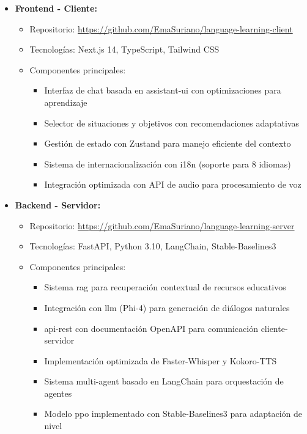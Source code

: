 \begin{itemize}
    \item \textbf{Frontend - Cliente:}
    \begin{itemize}
        \item Repositorio: \url{https://github.com/EmaSuriano/language-learning-client}
        \item Tecnologías: Next.js 14, TypeScript, Tailwind CSS
        \item Componentes principales:
              \begin{itemize}
                  \item Interfaz de chat basada en \gls{assistant-ui} con optimizaciones para aprendizaje
                  \item Selector de situaciones y objetivos con recomendaciones adaptativas
                  \item Gestión de estado con Zustand para manejo eficiente del contexto
                  \item Sistema de internacionalización con i18n (soporte para 8 idiomas)
                  \item Integración optimizada con API de audio para procesamiento de voz
              \end{itemize}
    \end{itemize}

    \item \textbf{Backend - Servidor:}
    \begin{itemize}
        \item Repositorio: \url{https://github.com/EmaSuriano/language-learning-server}
        \item Tecnologías: FastAPI, Python 3.10, LangChain, Stable-Baselines3
        \item Componentes principales:
              \begin{itemize}
                  \item Sistema \gls{rag} para recuperación contextual de recursos educativos
                  \item Integración con \gls{llm} (Phi-4) para generación de diálogos naturales
                  \item \gls{api-rest} con documentación OpenAPI para comunicación cliente-servidor
                  \item Implementación optimizada de Faster-Whisper y Kokoro-TTS
                  \item Sistema \gls{multi-agent} basado en LangChain para orquestación de agentes
                  \item Modelo \gls{ppo} implementado con Stable-Baselines3 para adaptación de nivel
              \end{itemize}
    \end{itemize}
\end{itemize}

